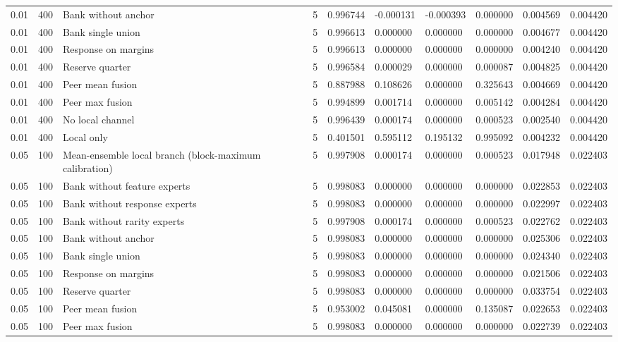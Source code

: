 \begin{tabular}{llllllllll}
0.01 & 400 & Bank without anchor & 5 & 0.996744 & -0.000131 & -0.000393 & 0.000000 & 0.004569 & 0.004420 \\
0.01 & 400 & Bank single union & 5 & 0.996613 & 0.000000 & 0.000000 & 0.000000 & 0.004677 & 0.004420 \\
0.01 & 400 & Response on margins & 5 & 0.996613 & 0.000000 & 0.000000 & 0.000000 & 0.004240 & 0.004420 \\
0.01 & 400 & Reserve quarter & 5 & 0.996584 & 0.000029 & 0.000000 & 0.000087 & 0.004825 & 0.004420 \\
0.01 & 400 & Peer mean fusion & 5 & 0.887988 & 0.108626 & 0.000000 & 0.325643 & 0.004669 & 0.004420 \\
0.01 & 400 & Peer max fusion & 5 & 0.994899 & 0.001714 & 0.000000 & 0.005142 & 0.004284 & 0.004420 \\
0.01 & 400 & No local channel & 5 & 0.996439 & 0.000174 & 0.000000 & 0.000523 & 0.002540 & 0.004420 \\
0.01 & 400 & Local only & 5 & 0.401501 & 0.595112 & 0.195132 & 0.995092 & 0.004232 & 0.004420 \\
0.05 & 100 & Mean-ensemble local branch (block-maximum calibration) & 5 & 0.997908 & 0.000174 & 0.000000 & 0.000523 & 0.017948 & 0.022403 \\
0.05 & 100 & Bank without feature experts & 5 & 0.998083 & 0.000000 & 0.000000 & 0.000000 & 0.022853 & 0.022403 \\
0.05 & 100 & Bank without response experts & 5 & 0.998083 & 0.000000 & 0.000000 & 0.000000 & 0.022997 & 0.022403 \\
0.05 & 100 & Bank without rarity experts & 5 & 0.997908 & 0.000174 & 0.000000 & 0.000523 & 0.022762 & 0.022403 \\
0.05 & 100 & Bank without anchor & 5 & 0.998083 & 0.000000 & 0.000000 & 0.000000 & 0.025306 & 0.022403 \\
0.05 & 100 & Bank single union & 5 & 0.998083 & 0.000000 & 0.000000 & 0.000000 & 0.024340 & 0.022403 \\
0.05 & 100 & Response on margins & 5 & 0.998083 & 0.000000 & 0.000000 & 0.000000 & 0.021506 & 0.022403 \\
0.05 & 100 & Reserve quarter & 5 & 0.998083 & 0.000000 & 0.000000 & 0.000000 & 0.033754 & 0.022403 \\
0.05 & 100 & Peer mean fusion & 5 & 0.953002 & 0.045081 & 0.000000 & 0.135087 & 0.022653 & 0.022403 \\
0.05 & 100 & Peer max fusion & 5 & 0.998083 & 0.000000 & 0.000000 & 0.000000 & 0.022739 & 0.022403 \\

\end{tabular}
